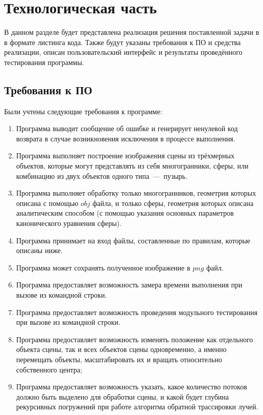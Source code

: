 \chapter{Технологическая часть}

В данном разделе будет представлена реализация решения поставленной задачи в в формате листинга кода. Также будут указаны требования к ПО и средства реализации, описан пользовательский интерфейс и результаты проведённого тестирования программы.

\section{Требования к ПО}
Были учтены следующие требования к программе:
\begin{enumerate}[label={\arabic*)}]
	\item Программа выводит сообщение об ошибке и генерирует ненулевой код возврата в случае возникновения исключения в процессе выполнения.
	\item Программа выполняет построение изображения сцены из трёхмерных объектов, которые могут представлять из себя многогранники, сферы, или комбинацию из двух объектов одного типа~---~пузырь.
	\item Программа выполняет обработку только многогранников, геометрия которых описана с помощью $obj$ файла, и только сферы, геометрия которых описана аналитическим способом (с помощью указания основных параметров канонического уравнения сферы).
	\item Программа принимает на вход файлы, составленные по правилам, которые описаны ниже.  
	\item Программа может сохранять полученное изображение в $png$ файл.
	\item Программа предоставляет возможность замера времени выполнения при вызове из командной строки.
	\item Программа предоставляет возможность проведения модульного тестирования при вызове из командной строки.
	\item Программа предоставляет возможность изменять положение как отдельного объекта сцены, так и всех объектов сцены одновременно, а именно перемещать объекты, масштабировать их и вращать относительно собственного центра;
	\item Программа предоставляет возможность указать, какое количество потоков должно быть выделено для обработки сцены, и какой будет глубина рекурсивных погружений при работе алгоритма обратной трассировки лучей.
\end{enumerate}

